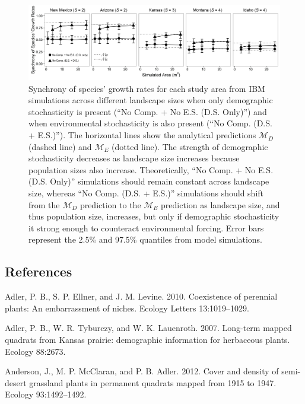 \documentclass[11pt,]{article}
\begin{document}
\pagebreak{}

\begin{figure}[!ht]
  \centering
      \includegraphics[width=6in]{./components/formatted_figures/formatted_figure2.png}
  \caption{Synchrony of species' growth rates for each study area from IBM simulations across different landscape sizes when only demographic stochasticity is present (``No Comp. + No E.S. (D.S. Only)'') and when environmental stochasticity is also present (``No Comp. (D.S. + E.S.)''). The horizontal lines show the analytical predictions $\mathcal{M}_D$ (dashed line) and $\mathcal{M}_E$ (dotted line). The strength of demographic stochasticity decreases as landscape size increases because population sizes also increase. Theoretically, ``No Comp. + No E.S. (D.S. Only)'' simulations should remain constant across landscape size, whereas ``No Comp. (D.S. + E.S.)'' simulations should shift from the $\mathcal{M}_D$ prediction to the $\mathcal{M}_E$ prediction as landscape size, and thus population size, increases, but only if demographic stochasticity it strong enough to counteract environmental forcing. Error bars represent the 2.5\% and 97.5\% quantiles from model simulations.}
\end{figure}

\pagebreak{}

\subsection*{References}\label{references}

Adler, P. B., S. P. Ellner, and J. M. Levine. 2010. Coexistence of
perennial plants: An embarrassment of niches. Ecology Letters
13:1019--1029.

Adler, P. B., W. R. Tyburczy, and W. K. Lauenroth. 2007. Long-term
mapped quadrats from Kansas prairie: demographic information for
herbaceous plants. Ecology 88:2673.

Anderson, J., M. P. McClaran, and P. B. Adler. 2012. Cover and density
of semi-desert grassland plants in permanent quadrats mapped from 1915
to 1947. Ecology 93:1492--1492.
\end{document}
